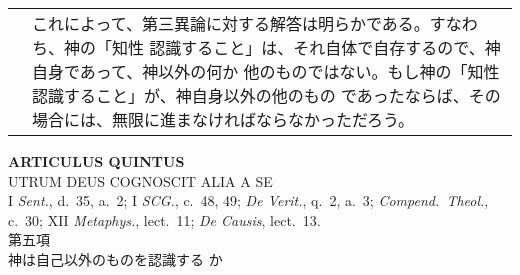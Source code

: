 \documentclass[10pt]{jsarticle} %
\begin{document}
\begin{longtable}{p{21em}p{21em}}
&

これによって、第三異論に対する解答は明らかである。すなわち、神の「知性
認識すること」は、それ自体で自存するので、神自身であって、神以外の何か
他のものではない。もし神の「知性認識すること」が、神自身以外の他のもの
であったならば、その場合には、無限に進まなければならなかっただろう。


\end{longtable}
\newpage



\begin{center}
{\Large {\bf ARTICULUS QUINTUS}}\\ {\large UTRUM DEUS COGNOSCIT ALIA A
SE}\\ {\footnotesize I {\itshape Sent.}, d.~35, a.~2; I {\itshape
SCG.}, c.~48, 49; {\itshape De Verit.}, q.~2, a.~3; {\itshape
Compend.~Theol.}, c.~30; XII {\itshape Metaphys.}, lect.~11; {\itshape
De Causis}, lect.~13.}\\ {\Large 第五項\\神は自己以外のものを認識する
か}
\end{center}
\end{document}
